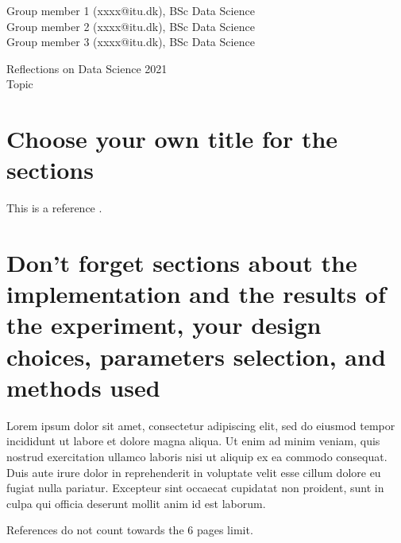 \documentclass[fleqn,12pt]{article}
\begin{document}
\setlength{\baselineskip}{1.44\baselineskip}



\begin{flushleft}
  {\large Group member 1 (xxxx@itu.dk), BSc Data Science \\
  Group member 2 (xxxx@itu.dk), BSc Data Science \\
  Group member 3 (xxxx@itu.dk), BSc Data Science \\}
 \end{flushleft}
 
\begin{center}
  {\Large Reflections on Data Science 2021}\\[5ex]
  {\Large Topic}\\[5ex]

 \end{center}
 




\parindent=20pt 
\parskip=0mm

\section{Choose your own title for the sections}

This is a reference \cite{bergstrom2020calling}.

\section{Don't forget sections about the implementation and the results of the experiment, your design choices, parameters selection, and methods used}
Lorem ipsum dolor sit amet, consectetur adipiscing elit, sed do eiusmod tempor incididunt ut labore et dolore magna aliqua. Ut enim ad minim veniam, quis nostrud exercitation ullamco laboris nisi ut aliquip ex ea commodo consequat. Duis aute irure dolor in reprehenderit in voluptate velit esse cillum dolore eu fugiat nulla pariatur. Excepteur sint occaecat cupidatat non proident, sunt in culpa qui officia deserunt mollit anim id est laborum.


 \newpage 
\small
References do not count towards the 6 pages limit.


\end{document}

